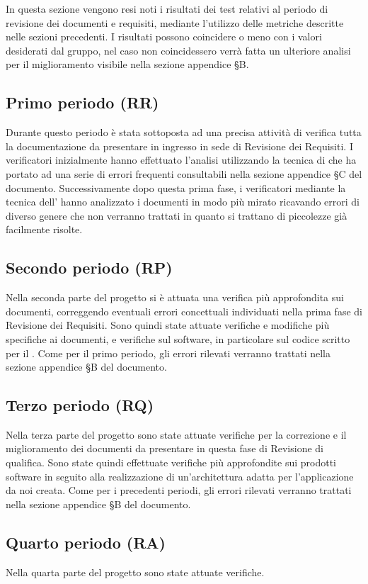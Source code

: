 \documentclass[../piano-di-qualifica.tex]{subfiles}
\begin{document}
In questa sezione vengono resi noti i risultati dei test relativi al periodo di revisione dei documenti e requisiti, mediante l'utilizzo delle metriche descritte nelle sezioni precedenti.
I risultati possono coincidere o meno con i valori desiderati dal gruppo, nel caso non coincidessero verrà fatta un ulteriore analisi per il miglioramento visibile nella sezione appendice §B.

\subsection{Primo periodo (RR)}
\label{sub:primo_periodo}
Durante questo periodo è stata sottoposta ad una precisa attività di verifica tutta la documentazione da presentare in ingresso in sede di Revisione dei Requisiti.
I verificatori inizialmente hanno effettuato l'analisi utilizzando la tecnica di  che ha portato ad una serie di errori frequenti consultabili nella sezione appendice §C del documento.
Successivamente dopo questa prima fase, i verificatori mediante la tecnica dell' hanno analizzato i documenti in modo più mirato ricavando errori di diverso genere che non verranno trattati in quanto si trattano di piccolezze già facilmente risolte.


\subsection{Secondo periodo (RP)}
\label{sub:secondo_periodo}
Nella seconda parte del progetto si è attuata una verifica più approfondita sui documenti, correggendo eventuali errori concettuali individuati nella prima fase di Revisione dei Requisiti.
Sono quindi state attuate verifiche e modifiche più specifiche ai documenti, e verifiche sul software, in particolare sul codice scritto per il .
Come per il primo periodo, gli errori rilevati verranno trattati nella sezione appendice §B del documento.
\label{sub:secondo_periodo}


\subsection{Terzo periodo (RQ)}
\label{sub:terzo_periodo}
Nella terza parte del progetto sono state attuate verifiche per la correzione e il miglioramento dei documenti da presentare in questa fase di Revisione di qualifica.
Sono state quindi effettuate verifiche più approfondite sui prodotti software in seguito alla realizzazione di un'architettura adatta per l'applicazione da noi creata.
Come per i precedenti periodi, gli errori rilevati verranno trattati nella sezione appendice §B del documento. 


\subsection{Quarto periodo (RA)}
\label{sub:terzo_periodo}
Nella quarta parte del progetto sono state attuate verifiche.

\end{document}
